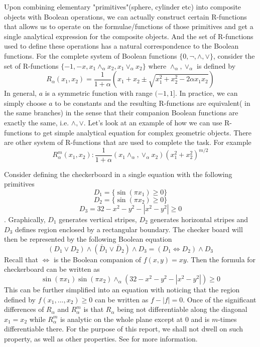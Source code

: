 \documentclass[11pt]{amsart}
\theoremstyle{definition}
\begin{document}
Upon combining elementary "primitives"(sphere, cylinder etc) into composite objects with Boolean operations, we can actually construct certain R-functions that allows us to operate on the formulae/functions of those primitives and get a single analytical expression for the composite objects. And the set of R-functions used to define these operations has a natural correspondence to the Boolean functions. For the complete system of Boolean functions $\{0, \neg, \wedge, \vee\}$, consider the set of R-functions $\{-1,-x, x_1\wedge_\alpha x_2, x_1\vee_\alpha x_2\}$ where $\wedge_\alpha, \vee_\alpha$ is defined by
$$R_\alpha(x_1,x_2)=\frac{1}{1+\alpha} (x_1+x_2\pm \sqrt{x_1^2+x_2^2-2\alpha x_1x_2})$$
In general, $a$ is a symmetric function with range $(-1,1]$. In practice, we can simply choose $a$ to be constants and the resulting R-functions are equivalent( in the same branches) in the sense that their companion Boolean functions are exactly the same, i.e. $\wedge,\vee$. Let's look at an example of how we can use R-functions to get simple analytical equation for complex geometric objects. There are other system of R-functions that are used to complete the task. For example
$$R_{\alpha}^m(x_1,x_2): \frac{1}{1+\alpha} (x_1 \wedge_\alpha ,\vee_\alpha x_2)(x_1^2+x_2^2)^{m/2}$$

Consider defining the checkerboard in a single equation with the following primitives 
$$D_1=\{\sin(\pi x_1)\geq 0\}$$
$$D_2=\{\sin(\pi x_2)\geq 0\}$$
$$D_3=32-x^2-y^2-|x^2-y^2|\geq 0$$. 
Graphically, $D_1$ generates vertical stripes, $D_2$ generates horizontal stripes and $D_3$ defines region enclosed by a rectangular boundary. The checker board will then be represented by the following Boolean equation
$$(D_1\vee D_2)\wedge (\bar{D}_1\vee \bar{D}_2)\wedge D_3=(D_1\Leftrightarrow D_2)\wedge D_3$$
Recall that $\Leftrightarrow$ is the Boolean companion of $f(x,y)=xy$. Then the formula for checkerboard can be written as 
$$\sin(\pi x_1)\sin(\pi x_2) \wedge_\alpha (32-x^2-y^2-|x^2-y^2|) \geq 0$$
This can be further simplified into an equation with noticing that the region defined by $f(x_1,...,x_2)\geq 0$ can be written as $f-|f|= 0$. Once of the significant differences of $R_\alpha$ and $R_{\alpha}^{m}$ is that $R_\alpha$ being not differentiable along the diagonal $x_1=x_2$ while $R_{\alpha}^m$ is analytic on the whole plane except at $0$ and is $m$-times differentiable there. For the purpose of this report, we shall not dwell on such property, as well as other properties. See for more information. 
\end{document}
